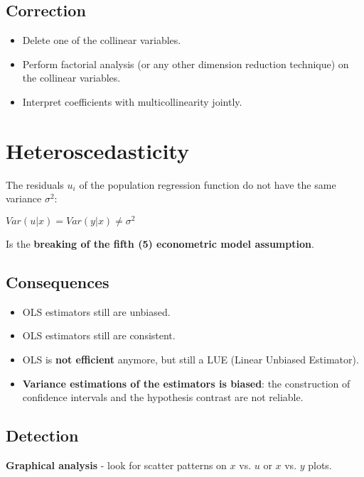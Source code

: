 \documentclass[10pt, a4paper, landscape]{extarticle}
\begin{document}
\begin{multicols}{3}
\subsection*{Correction}

\begin{itemize}[leftmargin=*]
\item Delete one of the collinear variables.
\item Perform factorial analysis (or any other dimension reduction technique) on the collinear variables.
\item Interpret coefficients with multicollinearity jointly.
\end{itemize}

\columnbreak

\section*{Heteroscedasticity}

The residuals $u_i$ of the population regression function do not have the same variance $\sigma^2$:

\begin{center}
$Var(u|x) = Var(y|x) \neq \sigma^2$
\end{center}

Is the \textbf{breaking of the fifth (5) econometric model assumption}.

\subsection*{Consequences}

\begin{itemize}[leftmargin=*]
\item OLS estimators still are unbiased.
\item OLS estimators still are consistent.
\item OLS is \textbf{not efficient} anymore, but still a LUE (Linear Unbiased Estimator).
\item \textbf{Variance estimations of the estimators is biased}: the construction of confidence intervals and the hypothesis contrast are not reliable.
\end{itemize}

\subsection*{Detection}

\begin{itemize}[leftmargin=*]
\setlength{\multicolsep}{0pt} %
\setlength{\columnsep}{20pt} %
\begin{multicols}{3} %
\item \textbf{Graphical analysis} - look for scatter patterns on $x$ vs. $u$ or $x$ vs. $y$ plots.


\end{multicols}
\end{itemize}
\end{multicols}
\end{document}

